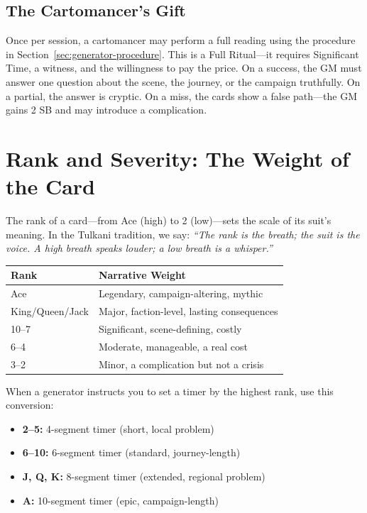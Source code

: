 \documentclass[11pt,letterpaper,twoside]{book}
\begin{document}
\subsection*{The Cartomancer's Gift}

Once per session, a cartomancer may perform a full reading using the procedure in Section~\ref{sec:generator-procedure}. This is a Full Ritual---it requires Significant Time, a witness, and the willingness to pay the price. On a success, the GM must answer one question about the scene, the journey, or the campaign truthfully. On a partial, the answer is cryptic. On a miss, the cards show a false path---the GM gains 2 SB and may introduce a complication.

\section*{Rank and Severity: The Weight of the Card}

The rank of a card---from Ace (high) to 2 (low)---sets the scale of its suit's meaning. In the Tulkani tradition, we say: \textit{``The rank is the breath; the suit is the voice. A high breath speaks louder; a low breath is a whisper.''}

\begin{center}
\begin{tabular}{|l|l|}
\hline
\textbf{Rank} & \textbf{Narrative Weight} \\
\hline
Ace & Legendary, campaign-altering, mythic \\
King/Queen/Jack & Major, faction-level, lasting consequences \\
10--7 & Significant, scene-defining, costly \\
6--4 & Moderate, manageable, a real cost \\
3--2 & Minor, a complication but not a crisis \\
\hline
\end{tabular}
\end{center}

When a generator instructs you to set a timer by the highest rank, use this conversion:

\begin{itemize}
    \item \textbf{2--5:} 4-segment timer (short, local problem)
    \item \textbf{6--10:} 6-segment timer (standard, journey-length)
    \item \textbf{J, Q, K:} 8-segment timer (extended, regional problem)
    \item \textbf{A:} 10-segment timer (epic, campaign-length)
\end{itemize}
\end{document}

